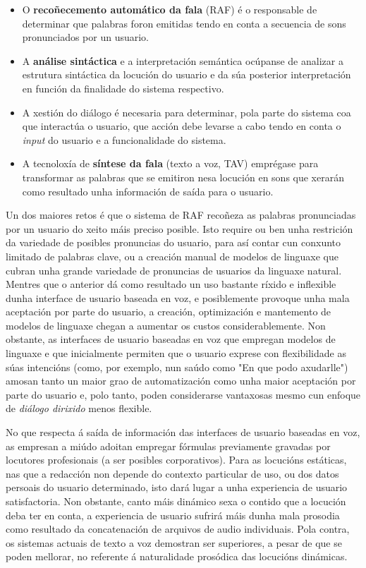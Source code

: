 \begin{multicols}{2}
\begin{itemize}
      \item O \textbf{recoñecemento automático da fala } (RAF) é o responsable de determinar que palabras foron emitidas tendo en conta a secuencia de sons pronunciados por un usuario.
      \item A \textbf{análise sintáctica } e a interpretación semántica ocúpanse de analizar a estrutura sintáctica da locución do usuario e da súa posterior interpretación en función da finalidade do sistema respectivo.
      \item A xestión do diálogo é necesaria para determinar, pola parte do sistema coa que interactúa o usuario, que acción debe levarse a cabo tendo en conta o \textit{input} do usuario e a funcionalidade do sistema.
      \item A tecnoloxía de  \textbf{síntese da fala} (texto a voz, TAV) emprégase para transformar as palabras que se emitiron nesa locución en sons que xerarán como resultado unha información de saída para o usuario.  
\end{itemize}

Un dos maiores retos é que o sistema de RAF recoñeza as palabras pronunciadas por un usuario do xeito máis preciso posible. Isto require ou ben unha restrición da variedade de posibles pronuncias do usuario, para así contar cun conxunto limitado de palabras clave, ou a creación manual de modelos de linguaxe que cubran unha grande variedade de pronuncias de usuarios da linguaxe natural. Mentres que o anterior dá como resultado un uso bastante ríxido e inflexible dunha interface de usuario baseada en voz, e posiblemente provoque unha mala aceptación por parte do usuario, a creación, optimización e mantemento de modelos de linguaxe chegan a aumentar os custos considerablemente. Non obstante, as interfaces de usuario baseadas en voz que empregan modelos de linguaxe e que inicialmente permiten que o usuario exprese con flexibilidade as súas intencións (como, por exemplo, nun saúdo como "En que podo axudarlle") amosan tanto un maior grao de automatización como unha maior aceptación por parte do usuario e, polo tanto, poden considerarse vantaxosas mesmo cun enfoque de \textit{diálogo dirixido }  menos flexible.


No que respecta á saída de información das interfaces de usuario baseadas en voz, as empresan a miúdo adoitan empregar fórmulas previamente gravadas por locutores profesionais (a ser posibles corporativos). Para as locucións estáticas, nas que a redacción non depende do contexto particular de uso, ou dos datos persoais do usuario determinado, isto dará lugar a unha experiencia de usuario satisfactoria. Non obstante, canto máis dinámico sexa o contido que a locución deba ter en conta, a experiencia de usuario sufrirá máis dunha mala prosodia como resultado da concatenación de arquivos de audio individuais. Pola contra, os sistemas actuais de texto a voz demostran ser superiores, a pesar de que se poden mellorar, no referente á naturalidade prosódica das locucións dinámicas. 


\end{multicols}
